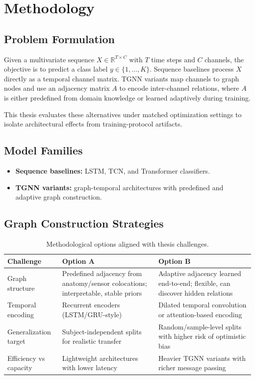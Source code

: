 \documentclass[11pt,a4paper]{article}
\begin{document}
\newpage
\section{Methodology}
\subsection{Problem Formulation}
Given a multivariate sequence $X \in \mathbb{R}^{T \times C}$ with $T$ time steps and $C$ channels, the objective is to predict a class label $y \in \{1,\dots,K\}$. Sequence baselines process $X$ directly as a temporal channel matrix. TGNN variants map channels to graph nodes and use an adjacency matrix $A$ to encode inter-channel relations, where $A$ is either predefined from domain knowledge or learned adaptively during training.

This thesis evaluates these alternatives under matched optimization settings to isolate architectural effects from training-protocol artifacts.

\subsection{Model Families}
\begin{itemize}[leftmargin=*]
  \item \textbf{Sequence baselines:} LSTM, TCN, and Transformer classifiers.
  \item \textbf{TGNN variants:} graph-temporal architectures with predefined and adaptive graph construction.
\end{itemize}

\subsection{Graph Construction Strategies}
\begin{table}[h]
\centering
\small
\begin{tabularx}{\textwidth}{@{}p{}p{}p{}@{}}
\toprule
\textbf{Challenge} & \textbf{Option A} & \textbf{Option B} \\
\midrule
Graph structure & Predefined adjacency from anatomy/sensor colocations; interpretable, stable priors & Adaptive adjacency learned end-to-end; flexible, can discover hidden relations \\
Temporal encoding & Recurrent encoders (LSTM/GRU-style) & Dilated temporal convolution or attention-based encoding \\
Generalization target & Subject-independent splits for realistic transfer & Random/sample-level splits with higher risk of optimistic bias \\
Efficiency vs capacity & Lightweight architectures with lower latency & Heavier TGNN variants with richer message passing \\
\bottomrule
\end{tabularx}
\caption{Methodological options aligned with thesis challenges.}
\end{table}
\end{document}
